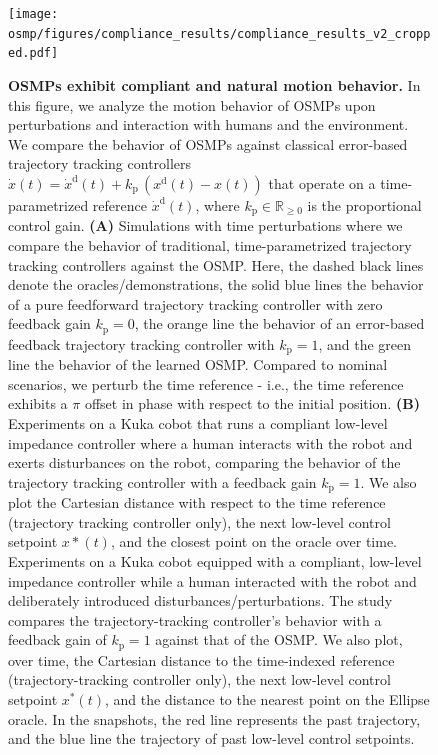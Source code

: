 \begin{figure}[h!]
    \centering
    \texttt{[image: osmp/figures/compliance\_results/compliance\_results\_v2\_cropped.pdf]}
    \caption{{\textbf{\glspl{OSMP} exhibit compliant and natural motion behavior.}
    In this figure, we analyze the motion behavior of \glspl{OSMP} upon perturbations and interaction with humans and the environment. We compare the behavior of \glspl{OSMP} against classical error-based trajectory tracking controllers $\dot{x}(t) = \dot{x}^\mathrm{d}(t) + k_\mathrm{p} \, (x^\mathrm{d}(t) - x(t))$ that operate on a time-parametrized reference $\dot{x}^\mathrm{d}(t)$, where $k_\mathrm{p} \in \mathbb{R}_{\geq 0}$ is the proportional control gain.
    \textbf{(A)} Simulations with time perturbations where we compare the behavior of traditional, time-parametrized trajectory tracking controllers against the \gls{OSMP}. Here, the dashed black lines denote the oracles/demonstrations, the solid blue lines the behavior of a pure feedforward trajectory tracking controller with zero feedback gain $k_\mathrm{p} = 0$, the orange line the behavior of an error-based feedback trajectory tracking controller with $k_\mathrm{p} = 1$, and the green line the behavior of the learned \gls{OSMP}. Compared to nominal scenarios, we perturb the time reference - i.e., the time reference exhibits a $\pi$ offset in phase with respect to the initial position.
    \textbf{(B)} Experiments on a Kuka cobot that runs a compliant low-level impedance controller where a human interacts with the robot and exerts disturbances on the robot, comparing the behavior of the trajectory tracking controller with a feedback gain $k_\mathrm{p} = 1$. We also plot the Cartesian distance with respect to the time reference (trajectory tracking controller only), the next low-level control setpoint $x*(t)$, and the closest point on the oracle over time.
    Experiments on a Kuka cobot equipped with a compliant, low-level impedance controller while a human interacted with the robot and deliberately introduced disturbances/perturbations. The study compares the trajectory-tracking controller’s behavior with a feedback gain of $k_\mathrm{p}=1$ against that of the \gls{OSMP}. We also plot, over time, the Cartesian distance to the time-indexed reference (trajectory-tracking controller only), the next low-level control setpoint $x^*(t)$, and the distance to the nearest point on the Ellipse oracle.
    In the snapshots, the red line represents the past trajectory, and the blue line the trajectory of past low-level control setpoints.
    }}
    \label{fig:osmp:compliance_results}
\end{figure}

